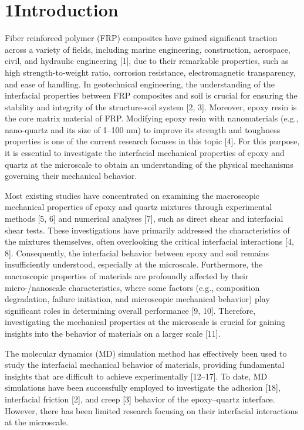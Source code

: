 \documentclass{article}
\begin{document}
\section*{1\quad Introduction}

Fiber reinforced polymer (FRP) composites have gained significant traction across a variety of fields, including marine engineering, construction, aerospace, civil, and hydraulic engineering [1], due to their remarkable properties, such as high strength-to-weight ratio, corrosion resistance, electromagnetic transparency, and ease of handling. In geotechnical engineering, the understanding of the interfacial properties between FRP composites and soil is crucial for ensuring the stability and integrity of the structure-soil system [2, 3]. Moreover, epoxy resin is the core matrix material of FRP. Modifying epoxy resin with nanomaterials (e.g., nano-quartz and its size of 1–100 nm) to improve its strength and toughness properties is one of the current research focuses in this topic [4]. For this purpose, it is essential to investigate the interfacial mechanical properties of epoxy and quartz at the microscale to obtain an understanding of the physical mechanisms governing their mechanical behavior.

Most existing studies have concentrated on examining the macroscopic mechanical properties of epoxy and quartz mixtures through experimental methods [5, 6] and numerical analyses [7], such as direct shear and interfacial shear tests. These investigations have primarily addressed the characteristics of the mixtures themselves, often overlooking the critical interfacial interactions [4, 8]. Consequently, the interfacial behavior between epoxy and soil remains insufficiently understood, especially at the microscale. Furthermore, the macroscopic properties of materials are profoundly affected by their micro-/nanoscale characteristics, where some factors (e.g., composition degradation, failure initiation, and microscopic mechanical behavior) play significant roles in determining overall performance [9, 10]. Therefore, investigating the mechanical properties at the microscale is crucial for gaining insights into the behavior of materials on a larger scale [11].

The molecular dynamics (MD) simulation method has effectively been used to study the interfacial mechanical behavior of materials, providing fundamental insights that are difficult to achieve experimentally [12–17]. To date, MD simulations have been successfully employed to investigate the adhesion [18], interfacial friction [2], and creep [3] behavior of the epoxy–quartz interface. However, there has been limited research focusing on their interfacial interactions at the microscale.
\end{document}
